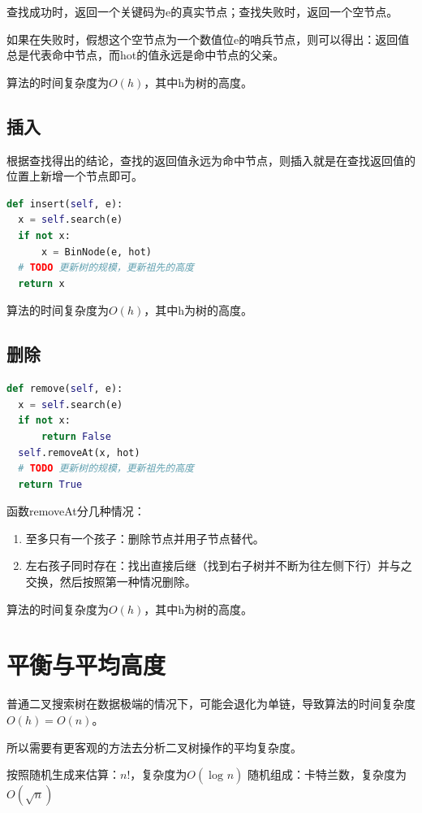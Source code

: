 \documentclass{article}
\begin{document}
查找成功时，返回一个关键码为e的真实节点；查找失败时，返回一个空节点。

如果在失败时，假想这个空节点为一个数值位e的哨兵节点，则可以得出：返回值总是代表命中节点，而hot的值永远是命中节点的父亲。

算法的时间复杂度为$O(h)$，其中h为树的高度。

\subsection{插入}

根据查找得出的结论，查找的返回值永远为命中节点，则插入就是在查找返回值的位置上新增一个节点即可。
\begin{lstlisting}[language=Python]
def insert(self, e):
  x = self.search(e)
  if not x:
      x = BinNode(e, hot)
  # TODO 更新树的规模，更新祖先的高度
  return x
\end{lstlisting}

算法的时间复杂度为$O(h)$，其中h为树的高度。

\subsection{删除}

\begin{lstlisting}[language=Python]
def remove(self, e):
  x = self.search(e)
  if not x:
      return False
  self.removeAt(x, hot)
  # TODO 更新树的规模，更新祖先的高度
  return True
\end{lstlisting}

函数removeAt分几种情况：
\begin{enumerate}
  \item 至多只有一个孩子：删除节点并用子节点替代。
  \item 左右孩子同时存在：找出直接后继（找到右子树并不断为往左侧下行）并与之交换，然后按照第一种情况删除。
\end{enumerate}

算法的时间复杂度为$O(h)$，其中h为树的高度。

\section{平衡与平均高度}
普通二叉搜索树在数据极端的情况下，可能会退化为单链，导致算法的时间复杂度$O(h) = O(n)$。

所以需要有更客观的方法去分析二叉树操作的平均复杂度。

按照随机生成来估算：$n!$，复杂度为$O(\log_{}n)$
随机组成：卡特兰数，复杂度为$O(\sqrt{n})$
\end{document}
